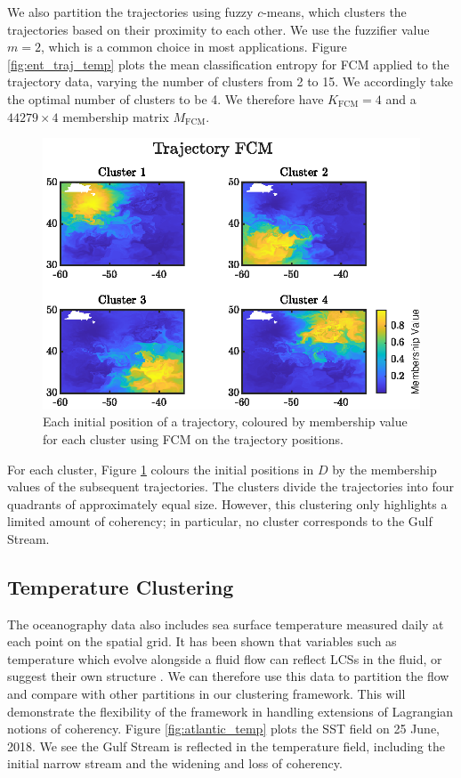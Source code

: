 \documentclass[a4paper, fontsize=12pt]{article}
\begin{document}
We also partition the trajectories using fuzzy \(c\)-means, which clusters the trajectories based on their proximity to each other. We use the fuzzifier value \(m = 2\), which is a common choice in most applications. Figure \ref{fig:ent_traj_temp} plots the mean classification entropy for FCM applied to the trajectory data, varying the number of clusters from 2 to 15. We accordingly take the optimal number of clusters to be 4. We therefore have \(K_{\text{FCM}} = 4\) and a \(44279\times4\) membership matrix \(M_{\text{FCM}}\).

\begin{figure}
\begin{center}
	\includegraphics[scale = 1.5]{../figures/atlantic_member_traj.eps}
	\caption{Each initial position of a trajectory, coloured by membership value for each cluster using FCM on the trajectory positions.}
	\label{fig:atlantic_traj_member}
\end{center}
\end{figure}

For each cluster, Figure \ref{fig:atlantic_traj_member} colours the initial positions in \(D\) by the membership values of the subsequent trajectories. The clusters divide the trajectories into four quadrants of approximately equal size. However, this clustering only highlights a limited amount of coherency; in particular, no cluster corresponds to the Gulf Stream. 


\subsection{Temperature Clustering}
The oceanography data also includes sea surface temperature measured daily at each point on the spatial grid. It has been shown that variables such as temperature which evolve alongside a fluid flow can reflect LCSs in the fluid, or suggest their own structure \citep{balasuriya_2018_glcs}. We can therefore use this data to partition the flow and compare with other partitions in our clustering framework. This will demonstrate the flexibility of the framework in handling extensions of Lagrangian notions of coherency. Figure \ref{fig:atlantic_temp} plots the SST field on 25 June, 2018. We see the Gulf Stream is reflected in the temperature field, including the initial narrow stream and the widening and loss of coherency.
\end{document}
